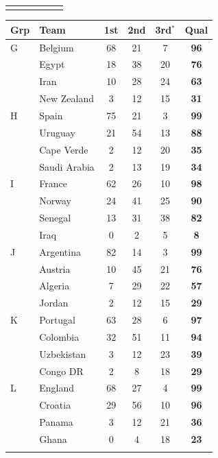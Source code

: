 \documentclass[11pt,a4paper]{article}
\begin{document}
\begin{table}[ht]
\begin{minipage}{0.49\textwidth}
\begin{tabular}{llcccc}
\addlinespace
\bottomrule
\end{tabular}
\end{minipage}\hfill
\begin{minipage}{0.49\textwidth}\centering
\begin{tabular}{llcccc}
\toprule
Grp & Team & 1st & 2nd & 3rd$^{*}$ & Qual \\
\midrule
G & Belgium & 68 & 21 & 7 & \textbf{96} \\
 & Egypt & 18 & 38 & 20 & \textbf{76} \\
 & Iran & 10 & 28 & 24 & \textbf{63} \\
 & New Zealand & 3 & 12 & 15 & \textbf{31} \\
\addlinespace
H & Spain & 75 & 21 & 3 & \textbf{99} \\
 & Uruguay & 21 & 54 & 13 & \textbf{88} \\
 & Cape Verde & 2 & 12 & 20 & \textbf{35} \\
 & Saudi Arabia & 2 & 13 & 19 & \textbf{34} \\
\addlinespace
I & France & 62 & 26 & 10 & \textbf{98} \\
 & Norway & 24 & 41 & 25 & \textbf{90} \\
 & Senegal & 13 & 31 & 38 & \textbf{82} \\
 & Iraq & 0 & 2 & 5 & \textbf{8} \\
\addlinespace
J & Argentina & 82 & 14 & 3 & \textbf{99} \\
 & Austria & 10 & 45 & 21 & \textbf{76} \\
 & Algeria & 7 & 29 & 22 & \textbf{57} \\
 & Jordan & 2 & 12 & 15 & \textbf{29} \\
\addlinespace
K & Portugal & 63 & 28 & 6 & \textbf{97} \\
 & Colombia & 32 & 51 & 11 & \textbf{94} \\
 & Uzbekistan & 3 & 12 & 23 & \textbf{39} \\
 & Congo DR & 2 & 8 & 18 & \textbf{29} \\
\addlinespace
L & England & 68 & 27 & 4 & \textbf{99} \\
 & Croatia & 29 & 56 & 10 & \textbf{96} \\
 & Panama & 3 & 12 & 21 & \textbf{36} \\
 & Ghana & 0 & 4 & 18 & \textbf{23} \\
\addlinespace
\bottomrule
\end{tabular}
\end{minipage}
\end{table}
\end{document}
